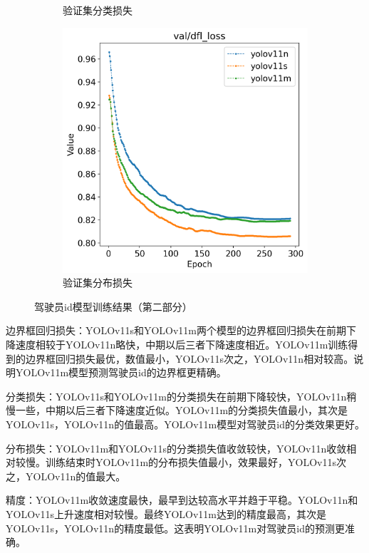 \begin{figure}[H]
\begin{subfigure}[t]{0.43\textwidth}
        \caption{验证集分类损失}
        \label{fig:track_val_cls_loss}
    \end{subfigure}
    \begin{subfigure}[t]{0.43\textwidth}
        \centering
        \includegraphics[width=\textwidth]{figs/chap04/track_result/track_val_dfl_loss.png}
        \caption{验证集分布损失}
        \label{fig:track_val_dfl_loss}
    \end{subfigure}
    \caption{驾驶员id模型训练结果（第二部分）}
    \label{fig:trackResult_part2}
\end{figure}

边界框回归损失：YOLOv11s和YOLOv11m两个模型的边界框回归损失在前期下降速度相较于YOLOv11n略快，中期以后三者下降速度相近。YOLOv11m训练得到的边界框回归损失最优，数值最小，YOLOv11s次之，YOLOv11n相对较高。说明YOLOv11m模型预测驾驶员id的边界框更精确。

分类损失：YOLOv11s和YOLOv11m的分类损失在前期下降较快，YOLOv11n稍慢一些，中期以后三者下降速度近似。YOLOv11m的分类损失值最小，其次是YOLOv11s，YOLOv11n的值最高。YOLOv11m模型对驾驶员id的分类效果更好。

分布损失：YOLOv11m和YOLOv11s的分类损失值收敛较快，YOLOv11n收敛相对较慢。训练结束时YOLOv11m的分布损失值最小，效果最好，YOLOv11s次之，YOLOv11n的值最大。

精度：YOLOv11m收敛速度最快，最早到达较高水平并趋于平稳。YOLOv11n和YOLOv11s上升速度相对较慢。最终YOLOv11m达到的精度最高，其次是YOLOv11s，YOLOv11n的精度最低。这表明YOLOv11m对驾驶员id的预测更准确。

